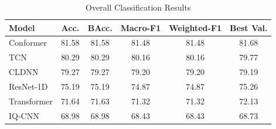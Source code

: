 \begin{table}[!t]
\caption{Overall Classification Results}
\label{tab:overall_results}
\centering
\footnotesize
\setlength{\tabcolsep}{3pt}
\renewcommand{\arraystretch}{1.12}
\begin{tabular}{lccccc}
\hline
\hline
Model & Acc. & BAcc. & Macro-F1 & Weighted-F1 & Best Val. \\
\hline
Conformer & 81.58 & 81.58 & 81.48 & 81.48 & 81.68 \\
TCN & 80.29 & 80.29 & 80.16 & 80.16 & 79.77 \\
CLDNN & 79.27 & 79.27 & 79.20 & 79.20 & 79.19 \\
ResNet-1D & 75.19 & 75.19 & 74.87 & 74.87 & 75.26 \\
Transformer & 71.64 & 71.63 & 71.32 & 71.32 & 72.13 \\
IQ-CNN & 68.98 & 68.98 & 68.43 & 68.43 & 68.73 \\
\hline
\hline
\end{tabular}
\end{table}
